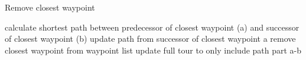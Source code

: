 \begin{breakablealgorithm}
	\caption{Remove closest waypoint}
	\label{alg:SAGenerateNeigborhoodRemove}
	\begin{algorithmic}[1]
		\STATE calculate shortest path between predecessor of closest waypoint (a) and successor of closest waypoint (b)
		\STATE update path from successor of closest waypoint a
		\STATE remove closest waypoint from waypoint list
		\STATE update full tour to only include path part a-b
	\end{algorithmic}
\end{breakablealgorithm}

